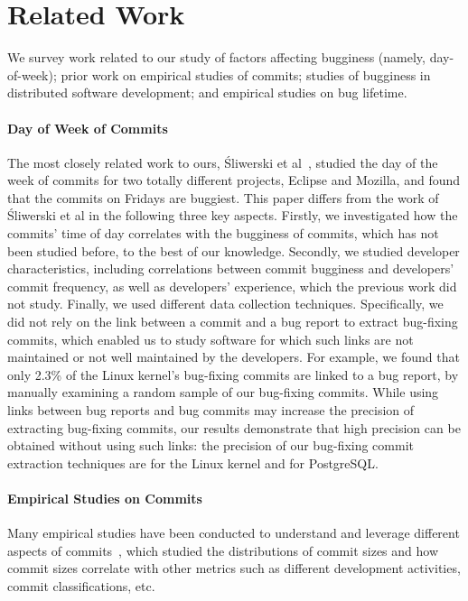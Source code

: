 \section{Related Work}
\label{sec-related}

We survey work related to our study of factors affecting bugginess (namely,
day-of-week); prior work on empirical studies of commits; studies of bugginess
in distributed software development; and empirical studies on bug lifetime.

\paragraph{Day of Week of Commits}

The most closely related work to ours, \'Sliwerski et
al~\cite{sliwerski-msr-2005}, studied the day of the week of commits for two
totally different projects, Eclipse and Mozilla, and found that the commits on
Fridays are buggiest. This paper differs from the work of \'Sliwerski et al in
the following three key aspects. Firstly, we investigated how the commits' time
of day correlates with the bugginess of commits, which has not been studied
before, to the best of our knowledge. Secondly, we studied developer
characteristics, including correlations between commit bugginess and developers'
commit frequency, as well as developers' experience, which the previous work did
not study. Finally, we used different data collection techniques. Specifically,
we did not rely on the link between a commit and a bug report to extract
bug-fixing commits, which enabled us to study software for which such links are
not maintained or not well maintained by the developers. For example, we found
that only 2.3\% of the Linux kernel's bug-fixing commits are linked to a bug
report, by manually examining a random sample of our bug-fixing commits. While
using links between bug reports and bug commits may increase the precision of
extracting bug-fixing commits, our results demonstrate that high precision can
be obtained without using such links: the precision of our bug-fixing commit
extraction techniques are \linuxP for the Linux kernel and \postP for
PostgreSQL.


\paragraph{Empirical Studies on Commits}

Many empirical studies have been conducted to understand and leverage different
aspects of
commits~\cite{hattori2008nature,largeCommits,commitTextualClassification,
  smallCommits05, Swanson76}, which studied the distributions of commit sizes
and how commit sizes correlate with other metrics such as different development
activities, commit classifications, etc.

